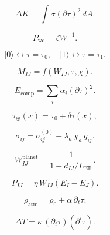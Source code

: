 \[
\Delta K = \int \sigma(\partial\tau)^2\, dA.
\]

\[
P_{\mathrm{wc}} = \zeta W^{-1}.
\]

\[
|0\rangle \leftrightarrow \tau=\tau_0,
\quad
|1\rangle \leftrightarrow \tau=\tau_1.
\]

\[
M_{IJ} = f(W_{IJ},\tau,\chi).
\]

\[
E_{\mathrm{comp}} = \sum_i \alpha_i (\partial\tau)^2.
\]

\[
\tau_{\oplus}(x) = \tau_0 + \delta\tau(x),
\]

\[
\sigma_{ij} = \sigma_{ij}^{(0)} + \lambda_a\,\chi_a\,g_{ij}.
\]

\[
W_{IJ}^{\text{planet}} = \frac{1}{1 + d_{IJ}/L_{\mathrm{ER}}}.
\]

\[
P_{IJ} = \eta\, W_{IJ}(E_I - E_J).
\]

\[
\rho_{\mathrm{atm}} = \rho_0 + \alpha\,\partial_t\tau.
\]

\[
\Delta T = \kappa\,(\partial_i \tau)(\partial^i \tau).
\]

